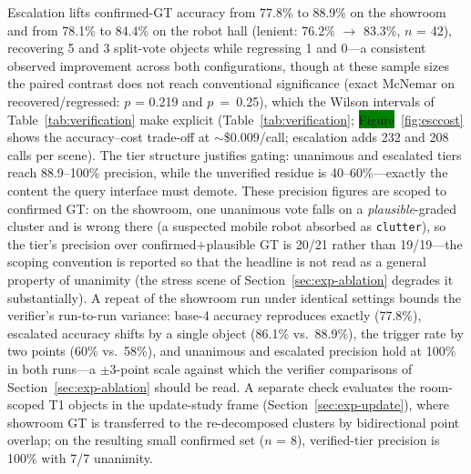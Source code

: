 \documentclass[electronics,article,accept,pdftex,moreauthors]{Definitions/mdpi}
\begin{document}
Escalation lifts confirmed-GT accuracy from 77.8\% to 88.9\% on the showroom
and from 78.1\% to 84.4\% on the robot hall (lenient: 76.2\%
$\rightarrow$ 83.3\%, $n$ {=} 42), recovering 5 and 3 split-vote objects while
regressing 1 and 0---a consistent observed improvement across both
configurations, though at these sample sizes the paired contrast does not
reach conventional significance (exact McNemar on recovered/regressed:
$p$ {=} 0.219 and \mbox{$p$ {=} 0.25}), which the Wilson intervals of
Table~\ref{tab:verification} make explicit (Table~\ref{tab:verification};
\colorbox{green}{Figure}~\ref{fig:esccost} %
shows the accuracy--cost trade-off at
$\sim$\$0.009/call; escalation adds 232 and 208 calls per scene). The tier
structure
justifies gating: unanimous and escalated tiers reach 88.9--100\% precision,
while the unverified residue is 40--60\%---exactly the content the query
interface must demote. These precision figures are scoped to confirmed
GT: on the showroom, one unanimous vote falls on a \emph{plausible}-graded
cluster and is wrong there (a suspected mobile robot absorbed as
\texttt{clutter}), so the tier's precision over confirmed$+$plausible GT is
20/21 rather than 19/19---the scoping convention is reported so that the
headline is not read as a general property of unanimity (the stress scene
of Section~\ref{sec:exp-ablation} degrades it substantially). A repeat of the showroom run under identical
settings bounds the verifier's run-to-run variance: base-4 accuracy
reproduces exactly (77.8\%), escalated accuracy shifts by a single object
(86.1\% vs.\ 88.9\%), the trigger rate by two points (60\% vs.\ 58\%), and
unanimous and escalated precision hold at 100\% in both runs---a
$\pm$3-point scale against which the verifier comparisons of
Section~\ref{sec:exp-ablation} should be read. A separate check evaluates the room-scoped T1 objects
in the update-study frame (Section~\ref{sec:exp-update}), where showroom GT is
transferred to the re-decomposed clusters by bidirectional point overlap;
on the resulting small confirmed set ($n$ {=} 8), verified-tier precision is
100\% with 7/7 unanimity.
\end{document}
